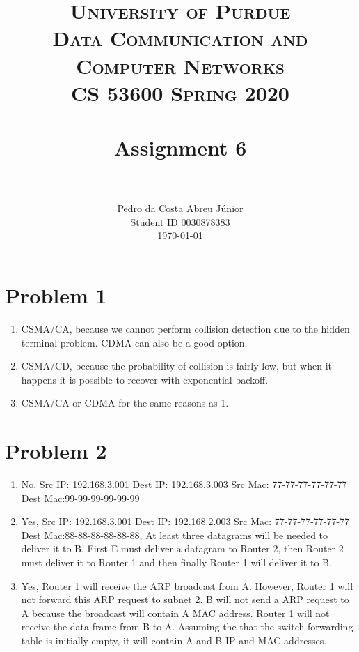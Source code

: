 \documentclass[paper=a4, fontsize=11pt]{scrartcl}
\title{
		\usefont{OT1}{bch}{b}{n}
		\normalfont \normalsize \textsc{University of Purdue\\
      Data Communication and Computer Networks\\
      CS 53600 Spring 2020} \\ [25pt]
		\horrule{0.5pt} \\[0.4cm]
		\huge Assignment 6\\
		\horrule{2pt} \\[0.5cm]
}
\author{
		\normalfont\normalsize Pedro da Costa Abreu Júnior\\ [-5pt]
    \normalsize Student ID 0030878383\\[-5pt]
    \normalsize \today
}
\date{}
\numberwithin{equation}{section}		%
\numberwithin{figure}{section}			%
\numberwithin{table}{section}				%
\begin{document}
\maketitle

\section*{Problem 1}
\begin{enumerate}
  \item CSMA/CA, because we cannot perform collision detection due to the hidden
terminal problem. CDMA can also be a good option.
  \item CSMA/CD, because the probability of collision is fairly low, but when it
happens it is possible to recover with exponential backoff.
  \item CSMA/CA or CDMA for the same reasons as 1.
\end{enumerate}

\section*{Problem 2}
\begin{enumerate}
  \item No,
    Src IP: 192.168.3.001
    Dest IP: 192.168.3.003
    Src Mac: 77-77-77-77-77-77
    Dest Mac:99-99-99-99-99-99
  
  \item Yes,
    Src IP: 192.168.3.001
    Dest IP: 192.168.2.003
    Src Mac: 77-77-77-77-77-77
    Dest Mac:88-88-88-88-88-88,
    At least three datagrams will be needed to deliver it to B.
    First E must deliver a datagram to Router 2, then Router 2 must deliver it to Router 1 and then finally Router 1 will deliver it to B.

  \item Yes, Router 1 will receive the ARP broadcast from A. However, Router 1 will not forward this ARP request to subnet 2. B will not send a ARP request to A because the broadcast will contain A MAC address. Router 1 will not receive the data frame from B to A. Assuming the that the switch forwarding table is initially empty, it will contain A and B IP and MAC addresses.

\end{enumerate}
\end{document}

